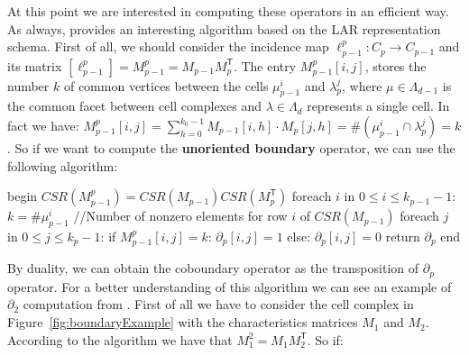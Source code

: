 At this point we are interested in computing these operators in an efficient way. As always, \cite{DiCarlo} provides an interesting algorithm based on the LAR representation schema. First of all, we should consider the incidence map $\ell_{p-1}^{p} \colon C_{p} \rightarrow C_{p-1}$ and its matrix $[\ell_{p-1}^{p}] = M^{p}_{p-1} = M_{p-1}M^{\mathsf{T}}_{p}$. The entry $M_{p-1}^{p}[i,j]$, stores the number $k$ of common vertices between the cells $\mu_{p-1}^{i}$ and $\lambda_{p}^{j}$, where $\mu \in \Lambda_{d-1}$ is the common facet between cell complexes and $\lambda \in \Lambda_{d}$ represents a single cell. In fact we have: $M^{p}_{p-1}[i,j] = \displaystyle\sum_{h=0}^{k_{0}-1} M_{p-1}[i,h] \cdot M_{p}[j,h] = \# (\mu_{p-1}^{i} \cap \lambda_{p}^{j}) = k$. So if we want to compute the \textbf{unoriented boundary} operator, we can use the following algorithm:

\begin{pseudo}[caption={Unoriented boundary algorithm}, label={lst:Boundary}]
begin
 $CSR(M_{p-1}^{p}) = CSR(M_{p-1})CSR(M_{p}^{\mathsf{T}})$
 foreach $i$ in $0 \leq i \leq k_{p-1} - 1$:
   $k = \#\mu_{p-1}^{i}$ //Number of nonzero elements for row $i$ of $CSR(M_{p-1})$
   foreach $j$ in $0 \leq j \leq k_{p} - 1$:
     if $M^{p}_{p-1}[i,j] = k$:
       $\partial_{p}[i, j] = 1$
     else:
       $\partial_{p}[i, j] = 0$
 return $\partial_{p}$
end       
\end{pseudo}

By duality, we can obtain the coboundary operator as the transposition of $\partial_{p}$ operator. For a better understanding of this algorithm we can see an example of $\partial_{2}$ computation from \cite{DiCarlo}. First of all we have to consider the cell complex in Figure~\ref{fig:boundaryExample} with the characteristics matrices $M_1$ and $M_2$. According to the algorithm we have that $M_{1}^{2} = M_{1}M_{2}^{\mathsf{T}}$. So if:\\

